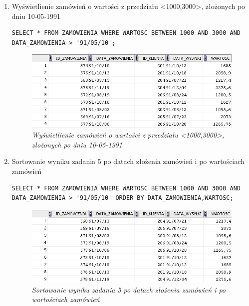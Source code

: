 \documentclass[a4paper, 10pt]{article}
\begin{document}
\begin{enumerate}
\item Wyświetlienie zamówień o wartości z przedziału <1000,3000>, złożonych po dniu 10-05-1991
\begin{lstlisting}[style=SQL, caption=\textit{Wyświetlienie zamówień o wartości z przedziału <1000,3000>, złożonych po dniu 10-05-1991}]
SELECT * FROM ZAMOWIENIA WHERE WARTOSC BETWEEN 1000 AND 3000 AND DATA_ZAMOWIENIA > '91/05/10';
\end{lstlisting}

\begin{figure}[H]
	\centering
	\includegraphics[scale=0.7]{zadanie5.png}
	\caption{\textit{Wyświetlienie zamówień o wartości z przedziału <1000,3000>, złożonych po dniu 10-05-1991}}
	\label{fig:zamowienia_data}

\end{figure}


\item Sortowanie wyniku zadania 5 po datach złożenia zamówień i po wartościach zamówień
\begin{lstlisting}[style=SQL, caption=\textit{Sortowanie wyniku zadania 5 po datach złożenia zamówień i po wartościach zamówień}]
SELECT * FROM ZAMOWIENIA WHERE WARTOSC BETWEEN 1000 AND 3000 AND DATA_ZAMOWIENIA > '91/05/10' ORDER BY DATA_ZAMOWIENIA,WARTOSC;
\end{lstlisting} 

\begin{figure}[H]
	\centering 
	\includegraphics[scale=0.7]{zadanie6.png}
	\caption{\textit{Sortowanie wyniku zadania 5 po datach złożenia zamówień     i po wartościach zamówień}}
	\label{fig:zamowienia_data_sort}
\end{figure}


\end{enumerate}
\end{document}
